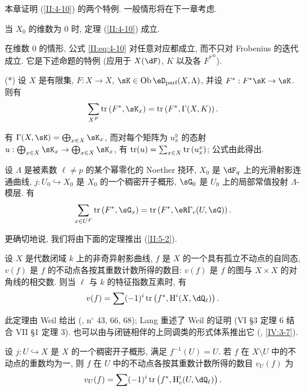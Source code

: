 本章证明 (\ref{II:4-10}) 的两个特例. 一般情形将在下一章考虑.

\begin{lemma_}\label{II:5-1}
当 $X_0$ 的维数为 $0$ 时, 定理 (\ref{II:4-10}) 成立.
\end{lemma_}

在维数 $0$ 的情形, 公式 \eqref{II:eq:4-10} 对任意对应都成立, 而不只对 Frobenius 的迭代成立. 它是下述命题的特例 (应用于 $X(\dF)$, $K$ 以及各 ${F^*}^n$).

(*) 设 $X$ 是有限集, $F:X\to X$, $\sK\in\ob\eD_\text{parf}(X,\Lambda)$, 并设 $F^*:F^* \sK\to \sK$. 则有
\[
  \sum_{X^F} \tr\left(F^*,\sK_x\right) = \tr\left(F^*,\Gamma(X,K)\right) \text{.}
\]

有 $\Gamma(X,\sK)=\bigoplus_{x\in X} \sK_x$, 而对每个矩阵为 $u_x^y$ 的态射 $u:\bigoplus_{x\in X} \sK_x\to \bigoplus_{x\in X} \sK_x$, 有 $\operatorname{tr}(u)=\sum_{x\in X} \operatorname{tr}\left(u_x^x\right)$; 公式由此得出.

\begin{lemma_}\label{II:5-2}
设 $\Lambda$ 是被素数 $\ell\ne p$ 的某个幂零化的 Noether 挠环, $X_0$ 是 $\dF_q$ 上的光滑射影连通曲线, $j:U_0\hookrightarrow X_0$ 是 $X_0$ 的一个稠密开子概形, $\sG_0$ 是 $U_0$ 上的局部常值投射 $\Lambda$-模层. 有
\[
  \sum_{x\in U^F} \tr\left(F^*,\sG_x\right) = \tr\left(F^*,\eR\Gamma_c(U,\sG)\right) \text{.}
\]
\end{lemma_}

更确切地说, 我们将由下面的定理推出 (\ref{II:5-2}).

\begin{theorem_}\label{II:5-3}
设 $X$ 是代数闭域 $k$ 上的非奇异射影曲线, $f$ 是 $X$ 的一个具有孤立不动点的自同态, $v(f)$ 是 $f$ 的不动点各按其重数计数所得的数目: $v(f)$ 是 $f$ 的图与 $X\times X$ 的对角线的相交数. 则当 $\ell$ 与 $k$ 的特征指数互素时, 有
\[
  v(f) = \sum (-1)^i \tr\left(f^*,\h^i(X,\dQ_\ell)\right) \text{.}
\]
\end{theorem_}

此定理由 Weil 给出 (\cite{we48}, n$^\circ$ 43, 66, 68); Lang \cite{la83} 重述了 Weil 的证明 (VI \S3 定理 6 结合 VII \S1 定理 3). 也可以由与闭链相伴的上同调类的形式体系推出它 (, \ref{IV:3-7}).

\begin{corollary_}\label{II:5-4}
设 $j:U\hookrightarrow X$ 是 $X$ 的一个稠密开子概形, 满足 $f^{-1}(U)=U$. 若 $f$ 在 $X\setminus U$ 中的不动点的重数均为一, 则 $f$ 在 $U$ 中的不动点各按其重数计数所得的数目 $v_U(f)$ 为
\[
  v_U(f) = \sum (-1)^i \tr\left(f^*,\h_c^i(U,\dQ_\ell)\right) \text{.}
\]
\end{corollary_}

